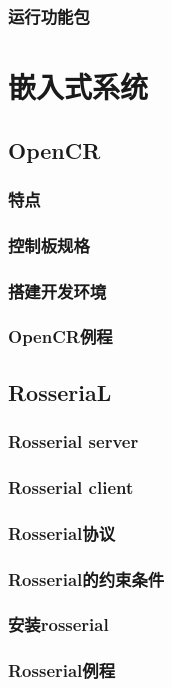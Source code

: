 \documentclass[geye,green,kindle,cn]{elegantnote}
\begin{document}
\subsubsection{运行功能包}
\section{嵌入式系统}
\subsection{OpenCR}
\subsubsection{特点}
\subsubsection{控制板规格}
\subsubsection{搭建开发环境}
\subsubsection{OpenCR例程}
\subsection{RosseriaL}
\subsubsection{Rosserial server}
\subsubsection{Rosserial client}
\subsubsection{Rosserial协议}
\subsubsection{Rosserial的约束条件}
\subsubsection{安装rosserial}
\subsubsection{Rosserial例程}
\end{document}
